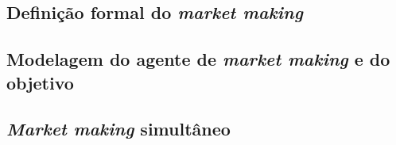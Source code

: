 \subsection{Definição formal do \textit{market making}}
\label{section:problem_description/definition}


\subsection{Modelagem do agente de \textit{market making} e do objetivo}
\label{section:problem_description/modeling}


\subsection{\textit{Market making} simultâneo}
\label{section:problem_description/multivariate_mm}

 